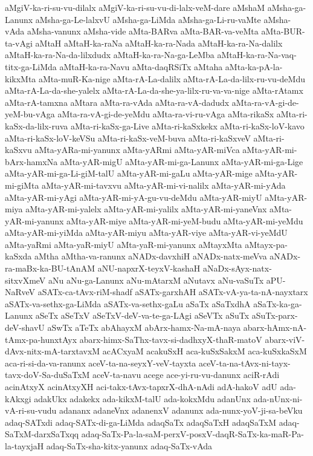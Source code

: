 {aMgiV-ka-ri-su-vu-dilalx
aMgiV-ka-ri-su-vu-di-lalx-veM-dare
aMshaM
aMsha-ga-Lanunx
aMsha-ga-Le-lalxvU
aMsha-ga-LiMda
aMsha-ga-Li-ru-vaMte
aMsha-vAda
aMsha-vanunx
aMsha-vide
aMta-BARva
aMta-BAR-va-veMta
aMta-BUR-ta-vAgi
aMtaH
aMtaH-ka-raNa
aMtaH-ka-ra-Nada
aMtaH-ka-ra-Na-dalilx
aMtaH-ka-ra-Na-da-lilxdudx
aMtaH-ka-ra-Na-ga-LeMba
aMtaH-ka-ra-Na-vaq-titx-ga-LiMda
aMtaH-ka-ra-Navu
aMta-daqRSiTx
aMtaha
aMta-ka-pA-la-kikxMta
aMta-muR-Ka-nige
aMta-rA-La-dalilx
aMta-rA-La-da-lilx-ru-vu-deMdu
aMta-rA-La-da-she-yalelx
aMta-rA-La-da-she-ya-lilx-ru-va-va-nige
aMta-rAtamx
aMta-rA-tamxna
aMtara
aMta-ra-vAda
aMta-ra-vA-dadudx
aMta-ra-vA-gi-de-yeM-bu-vAga
aMta-ra-vA-gi-de-yeMdu
aMta-ra-vi-ru-vAga
aMta-rikaSx
aMta-ri-kaSx-da-lilx-ruva
aMta-ri-kaSx-ga-Live
aMta-ri-kaSxkekx
aMta-ri-kaSx-loV-kavo
aMta-ri-kaSx-loV-keVSu
aMta-ri-kaSx-veM-buva
aMta-ri-kaSxveV
aMta-ri-kaSxvu
aMta-yARa-mi-yanunx
aMta-yARmi
aMta-yAR-miVca
aMta-yAR-mi-bArx-hamxNa
aMta-yAR-migU
aMta-yAR-mi-ga-Lanunx
aMta-yAR-mi-ga-Lige
aMta-yAR-mi-ga-Li-giM-talU
aMta-yAR-mi-gaLu
aMta-yAR-mige
aMta-yAR-mi-giMta
aMta-yAR-mi-tavxvu
aMta-yAR-mi-vi-nalilx
aMta-yAR-mi-yAda
aMta-yAR-mi-yAgi
aMta-yAR-mi-yA-gu-vu-deMdu
aMta-yAR-miyU
aMta-yAR-miya
aMta-yAR-mi-yalelx
aMta-yAR-mi-yalilx
aMta-yAR-mi-yaneVnx
aMta-yAR-mi-yanunx
aMta-yAR-miye
aMta-yAR-mi-yeM-budu
aMta-yAR-mi-yeMdu
aMta-yAR-mi-yiMda
aMta-yAR-miyu
aMta-yAR-viye
aMta-yAR-vi-yeMdU
aMta-yaRmi
aMta-yaR-miyU
aMta-yaR-mi-yanunx
aMtayxMta
aMtayx-pa-kaSxda
aMtha
aMtha-va-ranunx
aNADx-davxhiH
aNADx-natx-meVva
aNADx-ra-maBx-ka-BU-tAnAM
aNU-napxrX-teyxV-kashaH
aNaDx-sAyx-natx-sitxvXmeV
aNu
aNu-ga-Lanunx
aNu-mAtarxM
aNutavx
aNu-vaSuTx
aPU-NaRveV
aSATx-ca-tAvx-riM-shadf
aSATx-garxhAH
aSATx-vA-ya-ta-nA-nayxtarx
aSATx-va-sethx-ga-LiMda
aSATx-va-sethx-gaLu
aSaTx
aSaTxdhA
aSaTx-ka-ga-Lanunx
aSeTx
aSeTxV
aSeTxV-deV-va-te-ga-LAgi
aSeVTx
aSuTx
aSuTx-parx-deV-shavU
aSwTx
aTeTx
abAhayxM
abArx-hamx-Na-mA-naya
abarx-hAmx-nA-tAmx-pa-hunxtAyx
abarx-himx-SaThx-tavx-si-dadhxyX-thaR-matoV
abarx-viV-dAvx-nitx-mA-tarxtavxM
acACxyaM
acakuSxH
aca-kuSxSakxM
aca-kuSxkaSxM
aca-ri-si-da-va-ranunx
aceV-ta-na-seyxY-veV-tayxta
aceV-ta-na-tAvx-ni-tayx-tavx-doV-Sa-duSaTxM
aceV-ta-navu
acege
ace-yi-ru-vu-danunx
aciR-rAdi
acinAtxyX
acinAtxyXH
aci-takx-tAvx-tapxrX-dhA-nAdi
adA-hakoV
adU
ada-kAkxgi
adakUkx
adakekx
ada-kikxM-talU
ada-kokxMdu
adanUnx
ada-nUnx-ni-vA-ri-su-vudu
adananx
adaneVnx
adanenxV
adanunx
ada-nunx-yoV-ji-sa-beVku
adaq-SATxdi
adaq-SATx-di-ga-LiMda
adaqSaTx
adaqSaTxH
adaqSaTxM
adaq-SaTxM-darxSaTxqq
adaq-SaTx-Pa-la-saM-perxV-posxV-daqR-SaTx-ka-maR-Pa-la-tayxjaH
adaq-SaTx-sha-kitx-yanunx
adaq-SaTx-vAda
}
